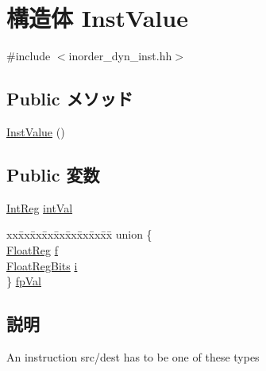 \hypertarget{structInOrderDynInst_1_1InstValue}{
\section{構造体 InstValue}
\label{structInOrderDynInst_1_1InstValue}
}


{\ttfamily \#include $<$inorder\_\-dyn\_\-inst.hh$>$}\subsection*{Public メソッド}
\begin{DoxyCompactItemize}
\item 
\hyperlink{structInOrderDynInst_1_1InstValue_a30b0b518a30ff1628921ea609230b510}{InstValue} ()
\end{DoxyCompactItemize}
\subsection*{Public 変数}
\begin{DoxyCompactItemize}
\item 
\hyperlink{classInOrderDynInst_a1355cb78d031430d4d70eb5080267604}{IntReg} \hyperlink{structInOrderDynInst_1_1InstValue_a9af9267a996a9e656af584e807cd8ca0}{intVal}
\item 
\begin{tabbing}
xx\=xx\=xx\=xx\=xx\=xx\=xx\=xx\=xx\=\kill
union \{\\
\>\hyperlink{classInOrderDynInst_a75484259f1855aabc8d74c6eb1cfe186}{FloatReg} \hyperlink{structInOrderDynInst_1_1InstValue_a375c327a2546e9117ea4bc65b2bffb00}{f}\\
\>\hyperlink{classInOrderDynInst_aab5eeae86499f9bfe15ef79360eccc64}{FloatRegBits} \hyperlink{structInOrderDynInst_1_1InstValue_ab76510481b35d98ae60b4a389d615f36}{i}\\
\} \hyperlink{structInOrderDynInst_1_1InstValue_ab15928ea3a026aa98a87b6b6ef98c08b}{fpVal}\\

\end{tabbing}\end{DoxyCompactItemize}


\subsection{説明}
An instruction src/dest has to be one of these types 


